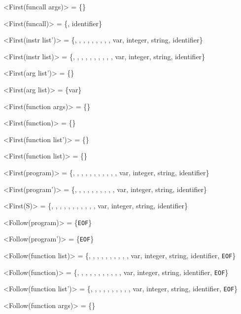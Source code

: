 <First(funcall args)>    = \{\lit{(}\}

<First(funcall)>         = \{\lit{\&}, identifier\}

<First(instr list')>     = \{, , , , \lit{(}, \lit{!}, \lit{+}, \lit{-}, \lit{\&}, var, integer, string, identifier\}

<First(instr list)>      = \{\lit{\{}, , , , , \lit{(}, \lit{!}, \lit{+}, \lit{-}, \lit{\&}, var, integer, string, identifier\}

<First(arg list')>       = \{\lit{,}\}

<First(arg list)>        = \{var\}

<First(function args)>   = \{\lit{(}\}

<First(function)>        = \{\}

<First(function list')>  = \{\}

<First(function list)>   = \{\}

<First(program)>         = \{, \lit{\{}, , , , , \lit{(}, \lit{!}, \lit{+}, \lit{-}, \lit{\&}, var, integer, string, identifier\}

<First(program')>        = \{\lit{\{}, , , , , \lit{(}, \lit{!}, \lit{+}, \lit{-}, \lit{\&}, var, integer, string, identifier\}

<First(S)>               = \{, \lit{\{}, , , , , \lit{(}, \lit{!}, \lit{+}, \lit{-}, \lit{\&}, var, integer, string, identifier\}

<Follow(program)>        = \{\texttt{EOF}\}

<Follow(program')>       = \{\texttt{EOF}\}

<Follow(function list)>  = \{\lit{\{}, , , , , \lit{(}, \lit{!}, \lit{+}, \lit{-}, \lit{\&}, var, integer, string, identifier, \texttt{EOF}\}

<Follow(function)>       = \{, \lit{\{}, , , , , \lit{(}, \lit{!}, \lit{+}, \lit{-}, \lit{\&}, var, integer, string, identifier, \texttt{EOF}\}

<Follow(function list')>  = \{\lit{\{}, , , , , \lit{(}, \lit{!}, \lit{+}, \lit{-}, \lit{\&}, var, integer, string, identifier, \texttt{EOF}\}

<Follow(function args)>   = \{\lit{\{}\}

